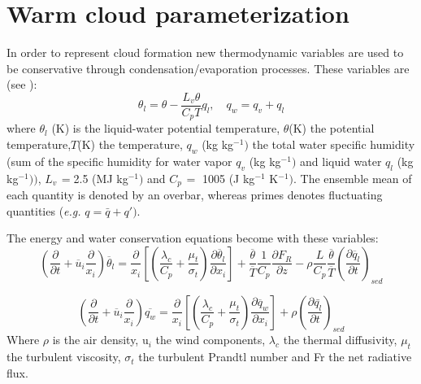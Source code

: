 \section{Warm cloud parameterization}
In order to represent cloud formation new thermodynamic variables are used
to be conservative through condensation/evaporation processes. These
variables are (see \cite{Betts:1973}):
\begin{equation}
\theta_{l} =\theta -\frac{L_{v} \theta }{C_{p} T }q_{l},
\quad
q_{w} =q_{v} +q_{l}
\end{equation}
\newline
where $\theta_{l}$ (K) is the liquid-water potential temperature,
\newline
$\theta $(K) the potential temperature,$T $(K) the temperature,
\newline
$q_{w}$ (kg kg$^{-1})$ the total water specific humidity (sum of the specific humidity
for water vapor $q_{v}$ (kg kg$^{-1})$ and liquid water $q_{l}$ (kg
kg$^{-1}))$,
\newline
$ L_{v\, }=$2.5 (MJ kg$^{-1})$ and $C_{p\, }=$ 1005 (J kg$^{-1}$ K$^{-1})$.
\newline
The ensemble mean of each quantity is denoted by an
overbar, whereas primes denotes fluctuating quantities (\emph{e.g.} $q=\bar{q}+q')$.

The energy and water conservation equations become with these variables:
\newline
\newline
\begin{equation}
\left( \frac{\partial }{\partial t}+\overline u_{i} \frac{\partial }{x_{i}}
\right)\overline \theta_{l} =\frac{\partial }{x_{i}}\left[ \left(
\frac{\lambda_{c}}{C_{p}}+\frac{\mu_{t}}{\sigma_{t}}
\right)\frac{\partial \overline \theta_{l} }{\partial x_{i}}
\right]+\frac{\overline \theta }{\overline T }\frac{1}{C_{p}}\frac{\partial
F_{R}}{\partial z}-\rho \frac{L}{C_{p}}\frac{\overline \theta }{\overline T}\left(
\frac{\partial \overline q_{l} }{\partial t} \right)_{sed}
\end{equation}

\begin{equation}
\left( \frac{\partial }{\partial t}+\overline u_{i} \frac{\partial }{x_{i}}
\right)\overline {q_{w}} =\frac{\partial }{x_{i}}\left[ \left( \frac{\lambda
_{c}}{C_{p}}+\frac{\mu_{t}}{\sigma_{t}} \right)\frac{\partial \overline
q_{w} }{\partial x_{i}} \right]+\rho \left( \frac{\partial
\bar{q_{l}}}{\partial t} \right)_{sed}
\end{equation}
Where $\rho $ is the air density, u$_{i}$ the wind components, $\lambda_{c}$ the thermal diffusivity, $\mu_{t}$ the turbulent viscosity,
$\sigma_{t}$ the turbulent Prandtl number and Fr the net radiative flux.

